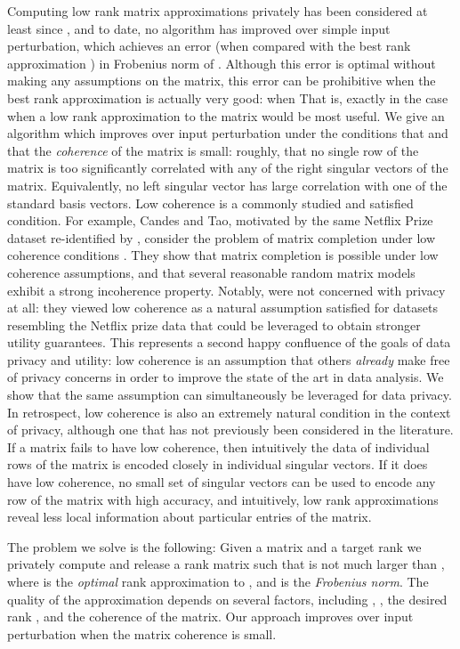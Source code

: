 \documentclass[letterpaper,11pt]{article}
\theoremstyle{definition}
\begin{document}
Computing low rank matrix approximations privately has been considered at
least since \cite{BlumDMN05}, and to date, no algorithm has improved over simple
input  perturbation, which achieves an error (when compared with the best rank
 approximation ) in Frobenius norm of . Although this error is optimal without making any assumptions on the matrix, this
error can be prohibitive when the best rank  approximation is actually very
good: when  That is, exactly in the case when a
low rank approximation to the matrix would be most useful.  We give an
algorithm which improves over input perturbation under the conditions that  and that the \emph{coherence} of the matrix is small: roughly, that no
single row of the matrix is too significantly correlated with any of the right singular
vectors of the matrix. Equivalently, no left singular vector has large
correlation with one of the standard basis vectors. Low coherence is a
commonly studied and satisfied condition. For example, Candes and Tao,
motivated by the same Netflix Prize dataset re-identified by
\cite{NarayananS08}, consider the problem of matrix completion under low
coherence conditions \cite{CandesT10}. They show that matrix completion is
possible under low coherence assumptions, and that several reasonable random
matrix models exhibit a strong incoherence property.  Notably, \cite{CandesT10}
were not concerned with privacy at all: they viewed low coherence as a natural
assumption satisfied for datasets resembling the Netflix prize data that could
be leveraged to obtain stronger utility guarantees. This represents a second
happy confluence of the goals of data privacy and utility: low coherence is an
assumption that others \emph{already} make free of privacy concerns
in order to improve the state of the art in data analysis.  We show that the
same assumption can simultaneously be leveraged for data privacy. In
retrospect, low coherence is also an extremely natural condition in the
context of privacy, although one that has not previously been considered in
the literature. If a matrix fails to have low coherence, then intuitively the
data of individual rows of the matrix is encoded closely in individual
singular vectors. If it does have low coherence, no small set of singular
vectors can be used to encode any row of the matrix with high accuracy, and
intuitively, low rank approximations reveal less local information about
particular entries of the matrix.

The problem we solve is the following: Given a matrix  and a target rank
 we privately compute and release a rank  matrix  such that
 is not much larger than , where  is the
\emph{optimal} rank  approximation to , and  is the
\emph{Frobenius norm}. The quality of the approximation depends on several
factors, including , , the desired rank , and the coherence of the
matrix. Our approach improves over input perturbation when the matrix
coherence is small.
\end{document}
